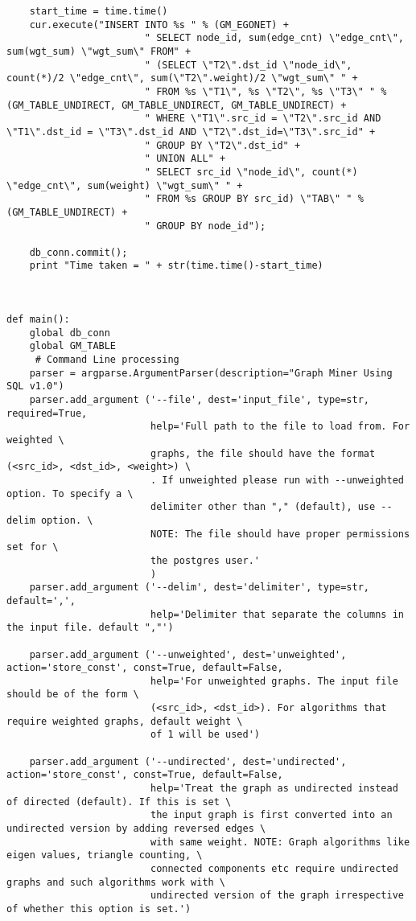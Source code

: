 \begin{lstlisting}
    start_time = time.time()
    cur.execute("INSERT INTO %s " % (GM_EGONET) +
                        " SELECT node_id, sum(edge_cnt) \"edge_cnt\", sum(wgt_sum) \"wgt_sum\" FROM" +
                        " (SELECT \"T2\".dst_id \"node_id\", count(*)/2 \"edge_cnt\", sum(\"T2\".weight)/2 \"wgt_sum\" " +
                        " FROM %s \"T1\", %s \"T2\", %s \"T3\" " % (GM_TABLE_UNDIRECT, GM_TABLE_UNDIRECT, GM_TABLE_UNDIRECT) +
                        " WHERE \"T1\".src_id = \"T2\".src_id AND \"T1\".dst_id = \"T3\".dst_id AND \"T2\".dst_id=\"T3\".src_id" +
                        " GROUP BY \"T2\".dst_id" +
                        " UNION ALL" +
                        " SELECT src_id \"node_id\", count(*) \"edge_cnt\", sum(weight) \"wgt_sum\" " +
                        " FROM %s GROUP BY src_id) \"TAB\" " % (GM_TABLE_UNDIRECT) +
                        " GROUP BY node_id");

    db_conn.commit();
    print "Time taken = " + str(time.time()-start_time)



def main():
    global db_conn
    global GM_TABLE
     # Command Line processing
    parser = argparse.ArgumentParser(description="Graph Miner Using SQL v1.0")
    parser.add_argument ('--file', dest='input_file', type=str, required=True,
                         help='Full path to the file to load from. For weighted \
                         graphs, the file should have the format (<src_id>, <dst_id>, <weight>) \
                         . If unweighted please run with --unweighted option. To specify a \
                         delimiter other than "," (default), use --delim option. \
                         NOTE: The file should have proper permissions set for \
                         the postgres user.'
                         )
    parser.add_argument ('--delim', dest='delimiter', type=str, default=',',
                         help='Delimiter that separate the columns in the input file. default ","')

    parser.add_argument ('--unweighted', dest='unweighted', action='store_const', const=True, default=False,
                         help='For unweighted graphs. The input file should be of the form \
                         (<src_id>, <dst_id>). For algorithms that require weighted graphs, default weight \
                         of 1 will be used')

    parser.add_argument ('--undirected', dest='undirected', action='store_const', const=True, default=False,
                         help='Treat the graph as undirected instead of directed (default). If this is set \
                         the input graph is first converted into an undirected version by adding reversed edges \
                         with same weight. NOTE: Graph algorithms like eigen values, triangle counting, \
                         connected components etc require undirected graphs and such algorithms work with \
                         undirected version of the graph irrespective of whether this option is set.')


\end{lstlisting}
